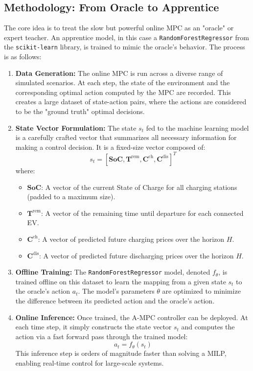 \subsection{Methodology: From Oracle to Apprentice}
The core idea is to treat the slow but powerful online MPC as an "oracle" or expert teacher. An apprentice model, in this case a \texttt{RandomForestRegressor} from the \texttt{scikit-learn} library, is trained to mimic the oracle's behavior. The process is as follows:
\begin{enumerate}
    \item \textbf{Data Generation:} The online MPC is run across a diverse range of simulated scenarios. At each step, the state of the environment and the corresponding optimal action computed by the MPC are recorded. This creates a large dataset of state-action pairs, where the actions are considered to be the "ground truth" optimal decisions.
    \item \textbf{State Vector Formulation:} The state $s_t$ fed to the machine learning model is a carefully crafted vector that summarizes all necessary information for making a control decision. It is a fixed-size vector composed of:
    \begin{equation}
        s_t = [ \mathbf{SoC}, \mathbf{T}^{\text{rem}}, \mathbf{C}^{\text{ch}}, \mathbf{C}^{\text{dis}} ]^T
    \end{equation}
    where:
    \begin{itemize}
        \item $\mathbf{SoC}$: A vector of the current State of Charge for all charging stations (padded to a maximum size).
        \item $\mathbf{T}^{\text{rem}}$: A vector of the remaining time until departure for each connected EV.
        \item $\mathbf{C}^{\text{ch}}$: A vector of predicted future charging prices over the horizon $H$.
        \item $\mathbf{C}^{\text{dis}}$: A vector of predicted future discharging prices over the horizon $H$.
    \end{itemize}
    \item \textbf{Offline Training:} The \texttt{RandomForestRegressor} model, denoted $f_{\theta}$, is trained offline on this dataset to learn the mapping from a given state $s_t$ to the oracle's action $a_t$. The model's parameters $\theta$ are optimized to minimize the difference between its predicted action and the oracle's action.
    \item \textbf{Online Inference:} Once trained, the A-MPC controller can be deployed. At each time step, it simply constructs the state vector $s_t$ and computes the action via a fast forward pass through the trained model:
    \begin{equation}
        a_t = f_{\theta}(s_t)
    \end{equation}
    This inference step is orders of magnitude faster than solving a MILP, enabling real-time control for large-scale systems.
\end{enumerate}

